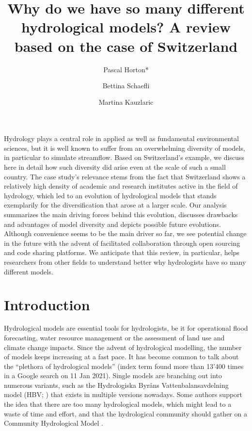 \documentclass[10pt,a4paper]{article}
\renewenvironment{abstract}
 {{\bfseries\noindent{\abstractname}\par\nobreak}\footnotesize}
 {\bigskip}
\begin{document}
\title{Why do we have so many different hydrological models? A review based on the case of Switzerland}


\author[1]{Pascal Horton*}
\author[1]{Bettina Schaefli}
\author[1]{Martina Kauzlaric}


 \date{}


\begingroup
\maketitle
\endgroup




\begin{abstract}
Hydrology plays a central role in applied as well as fundamental environmental sciences, but it is well known to suffer from an overwhelming diversity of models, in particular to simulate streamflow. Based on Switzerland's example, we discuss here in detail how such diversity did arise even at the scale of such a small country. The case study's relevance stems from the fact that Switzerland shows a relatively high density of academic and research institutes active in the field of hydrology, which led to an evolution of hydrological models that stands exemplarily for the diversification that arose at a larger scale. Our analysis summarizes the main driving forces behind this evolution, discusses drawbacks and advantages of model diversity and depicts possible future evolutions. Although convenience seems to be the main driver so far, we see potential change in the future with the advent of facilitated collaboration through open sourcing and code sharing platforms. We anticipate that this review, in particular, helps researchers from other fields to understand better why hydrologists have so many different models.
\end{abstract}%


\section{Introduction}
\label{sec:intro}

Hydrological models are essential tools for hydrologists, be it for
operational flood forecasting, water resource management or the
assessment of land use and climate change impacts. Since the advent of
hydrological modelling, the number of models keeps increasing at a fast
pace. It has become common to talk about the ``plethora of hydrological
models'' (index term found more than 13'400 times in a Google search on
11 Jan 2021). Single models are branching out into numerous variants,
such as the Hydrologiska Byråns Vattenbalansavdelning model
(HBV; \citealp{Bergstrom1976a,Bergstrom1992,Bergstrom1995,Lindstr_m_1997}) that exists in multiple versions nowadays.
Some authors support the idea that there are too many hydrological
models, which might lead to a waste of time and effort, and that the
hydrological community should gather on a Community Hydrological
Model \citep{Weiler_2015}.
\end{document}
